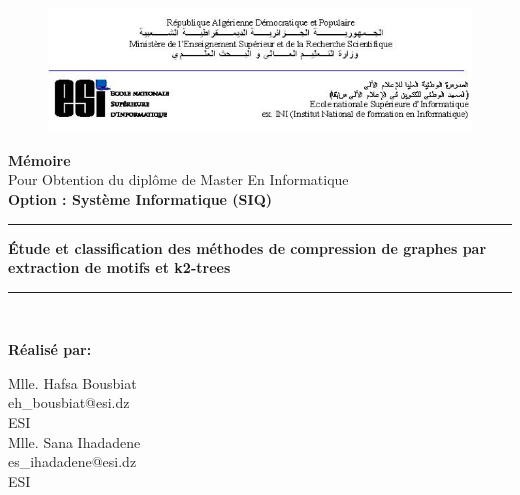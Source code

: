 \begin{titlepage}





	\begin{figure}[t]
		\includegraphics[scale=0.75]{./ressources/image/ESI.png}\\[0.6in]
	\end{figure}
	
	
	
	\begin{center}
	
		\LARGE \textbf{ Mémoire}\\
		\Large{
			Pour Obtention du diplôme de Master En Informatique\\
			\textbf{Option : Système Informatique (SIQ)}
		}\\[0.2in]
		\huge {
		\rule{\linewidth}{.5pt}
			\textbf{
				Étude et classification des méthodes de compression de graphes par extraction de motifs et k2-trees
			} 
			\rule{\linewidth}{.5pt}
		}\\[0.5in]
		\Large
	
	\textbf{Réalisé par:}\\
	\begin{multicols}{2}
			\Large 	Mlle. Hafsa Bousbiat\\
			\large eh\_bousbiat@esi.dz\\
			ESI\\
		\columnbreak
 			\Large Mlle. Sana Ihadadene\\
			\large es\_ihadadene@esi.dz\\
			ESI \\
		

\end{multicols}
\end{center}
\end{titlepage}
